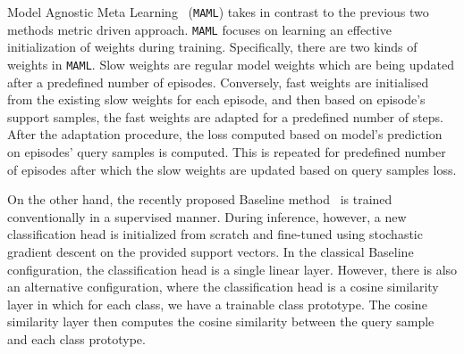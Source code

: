 Model Agnostic Meta Learning~\cite{maml} (\texttt{MAML}) takes in contrast to the previous two methods metric driven approach. \texttt{MAML} focuses on learning an effective initialization of weights during training. Specifically, there are two kinds of weights in \texttt{MAML}. Slow weights are regular model weights which are being updated after a predefined number of episodes. Conversely, fast weights are initialised from the existing slow weights for each episode, and then based on episode's support samples, the fast weights are adapted for a predefined number of steps. After the adaptation procedure, the loss computed based on model's prediction on episodes' query samples is computed. This is repeated for predefined number of episodes after which the slow weights are updated based on query samples loss.

On the other hand, the recently proposed Baseline method~\cite{baseline} is trained conventionally in a supervised manner.  During inference, however, a new classification head is initialized from scratch and fine-tuned using stochastic gradient  descent on the provided support vectors. In the classical Baseline configuration, the classification head is a single linear layer. However, there is also an alternative configuration, where the classification head is a cosine similarity layer in which for each  class, we have a trainable class prototype. The cosine similarity layer then computes the cosine similarity between the query sample  and each class prototype.





